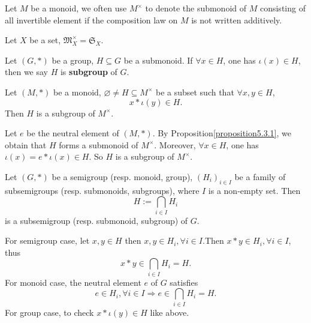 \begin{notationenv}
    Let $M$ be a monoid,  we often use $M^\times$ to denote the submonoid of $M$ consisting of all invertible element if the composition law on $M$ is not written additively.
\end{notationenv}
\begin{exampleenv}
    Let $X$ be a set,  $\mathfrak{M} _X^\times=\mathfrak{S} _X$.
\end{exampleenv}
\begin{definitionenv}
    Let $(G, *)$ be a group,  $H\subseteq G$ be a submonoid. If $\forall x\in H$,  one has $\iota(x)\in H$,  then we say $H$ is \textbf{subgroup} of $G$.
\end{definitionenv}
\begin{propositionenv}
    Let $(M, *)$ be a monoid,  $\varnothing \not=H\subseteq M^\times$ be a subset such that $\forall x, y \in H$, 
    $$x*\iota(y)\in H.$$
    Then $H$ is a subgroup of $M^\times$.
\end{propositionenv}
\begin{proofenv}
    Let $e$ be the neutral element of $(M, *)$. By Proposition\ref{proposition5.3.1}, we obtain that $H$ forms a submonoid of $M^\times$.
    Moreover, $\forall x \in H$, one has $\iota(x)=e*\iota(x)\in H$. So $H$ is a subgroup of $M^\times$.
\end{proofenv}
\begin{propositionenv}
    Let $(G, *)$ be a semigroup (resp. monoid, group),  $(H_i)_{i\in I}$ be a family of subsemigroups (resp. submonoids, subgroups), where $I$ is a non-empty set. Then 
    $$H:=\bigcap_{i\in I}H_i$$
    is a subsemigroup (resp. submonoid, subgroup) of $G$.
\end{propositionenv}
\begin{proofenv}
    \quad\newline
    For semigroup case, let $x, y\in H$ then $x, y\in H_i, \forall i \in I$.Then $x*y\in H_i, \forall i \in I $,  thus 
    $$x*y\in \bigcap_{i\in I}H_i=H.$$
    For monoid case, the neutral element $e$ of $G$ satisfies
    $$e \in H_i, \forall i \in I\Rightarrow e\in \bigcap_{i\in I}H_i=H.$$
    For group case, to check $x*\iota(y)\in H$ like above.
\end{proofenv}
